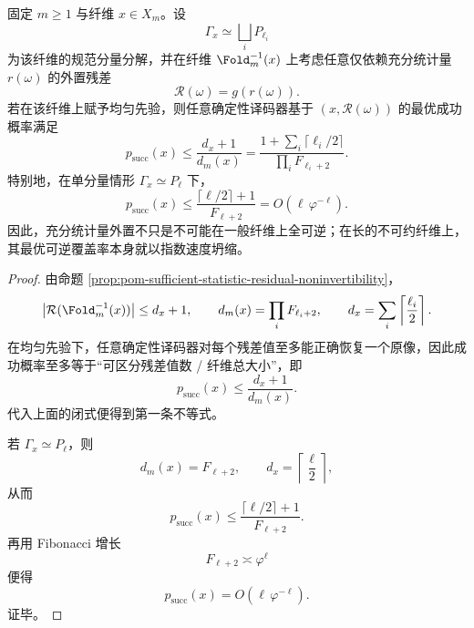 \begin{theorem}[充分统计量外置的最优可逆覆盖率坍缩]\label{thm:conclusion-sufficient-statistic-externalization-success-collapse}
固定 \(m\ge 1\) 与纤维 \(x\in X_m\)。设
\[
\Gamma_x\simeq\bigsqcup_i P_{\ell_i}
\]
为该纤维的规范分量分解，并在纤维 \(\Fold_m^{-1}(x)\) 上考虑任意仅依赖充分统计量 \(r(\omega)\) 的外置残差
\[
\mathcal R(\omega)=g(r(\omega)).
\]
若在该纤维上赋予均匀先验，则任意确定性译码器基于 \((x,\mathcal R(\omega))\) 的最优成功概率满足
\[
p_{\mathrm{succ}}(x)
\le
\frac{d_x+1}{d_m(x)}
=
\frac{1+\sum_i\lceil \ell_i/2\rceil}{\prod_i F_{\ell_i+2}}.
\]
特别地，在单分量情形 \(\Gamma_x\simeq P_\ell\) 下，
\[
p_{\mathrm{succ}}(x)
\le
\frac{\lceil \ell/2\rceil+1}{F_{\ell+2}}
=
O(\ell\,\varphi^{-\ell}).
\]
因此，充分统计量外置不只是不可能在一般纤维上全可逆；在长的不可约纤维上，其最优可逆覆盖率本身就以指数速度坍缩。
\end{theorem}
\begin{proof}
由命题 \ref{prop:pom-sufficient-statistic-residual-noninvertibility}，
\[
\bigl|\mathcal R(\Fold_m^{-1}(x))\bigr|\le d_x+1,
\qquad
d_m(x)=\prod_i F_{\ell_i+2},
\qquad
d_x=\sum_i\left\lceil\frac{\ell_i}{2}\right\rceil.
\]
在均匀先验下，任意确定性译码器对每个残差值至多能正确恢复一个原像，因此成功概率至多等于“可区分残差值数 / 纤维总大小”，即
\[
p_{\mathrm{succ}}(x)\le \frac{d_x+1}{d_m(x)}.
\]
代入上面的闭式便得到第一条不等式。

若 \(\Gamma_x\simeq P_\ell\)，则
\[
d_m(x)=F_{\ell+2},
\qquad
d_x=\left\lceil\frac{\ell}{2}\right\rceil,
\]
从而
\[
p_{\mathrm{succ}}(x)
\le
\frac{\lceil \ell/2\rceil+1}{F_{\ell+2}}.
\]
再用 Fibonacci 增长
\[
F_{\ell+2}\asymp \varphi^\ell
\]
便得
\[
p_{\mathrm{succ}}(x)=O(\ell\,\varphi^{-\ell}).
\]
证毕。
\end{proof}

